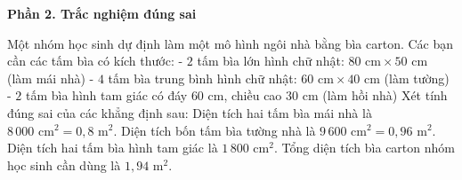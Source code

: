 \textbf{Phần 2. Trắc nghiệm đúng sai}

\begin{ex} %
Một nhóm học sinh dự định làm một mô hình ngôi nhà bằng bìa carton. Các bạn cần các tấm bìa có kích thước:
- $2$ tấm bìa lớn hình chữ nhật: $80\text{ cm} \times 50\text{ cm}$ (làm mái nhà)
- $4$ tấm bìa trung bình hình chữ nhật: $60\text{ cm} \times 40\text{ cm}$ (làm tường)
- $2$ tấm bìa hình tam giác có đáy $60\text{ cm}$, chiều cao $30\text{ cm}$ (làm hồi nhà)
Xét tính đúng sai của các khẳng định sau:
\choiceTF
{\True Diện tích hai tấm bìa mái nhà là $8\,000\text{ cm}^2 = 0{,}8\text{ m}^2$.}
{\True Diện tích bốn tấm bìa tường nhà là $9\,600\text{ cm}^2 = 0{,}96\text{ m}^2$.}
{Diện tích hai tấm bìa hình tam giác là $1\,800\text{ cm}^2$.}
{\True Tổng diện tích bìa carton nhóm học sinh cần dùng là $1{,}94\text{ m}^2$.}
\end{ex}


